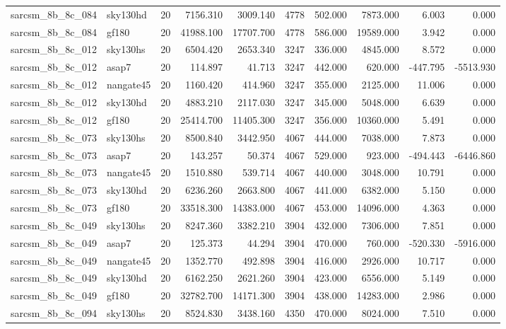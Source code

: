 \documentclass{article}
\begin{document}
\begin{longtable}{llrrrrrrrr}
sarcsm\_8b\_8c\_084 & sky130hd & 20 & 7156.310 & 3009.140 & 4778 & 502.000 & 7873.000 & 6.003 & 0.000 \\
sarcsm\_8b\_8c\_084 & gf180 & 20 & 41988.100 & 17707.700 & 4778 & 586.000 & 19589.000 & 3.942 & 0.000 \\
sarcsm\_8b\_8c\_012 & sky130hs & 20 & 6504.420 & 2653.340 & 3247 & 336.000 & 4845.000 & 8.572 & 0.000 \\
sarcsm\_8b\_8c\_012 & asap7 & 20 & 114.897 & 41.713 & 3247 & 442.000 & 620.000 & -447.795 & -5513.930 \\
sarcsm\_8b\_8c\_012 & nangate45 & 20 & 1160.420 & 414.960 & 3247 & 355.000 & 2125.000 & 11.006 & 0.000 \\
sarcsm\_8b\_8c\_012 & sky130hd & 20 & 4883.210 & 2117.030 & 3247 & 345.000 & 5048.000 & 6.639 & 0.000 \\
sarcsm\_8b\_8c\_012 & gf180 & 20 & 25414.700 & 11405.300 & 3247 & 356.000 & 10360.000 & 5.491 & 0.000 \\
sarcsm\_8b\_8c\_073 & sky130hs & 20 & 8500.840 & 3442.950 & 4067 & 444.000 & 7038.000 & 7.873 & 0.000 \\
sarcsm\_8b\_8c\_073 & asap7 & 20 & 143.257 & 50.374 & 4067 & 529.000 & 923.000 & -494.443 & -6446.860 \\
sarcsm\_8b\_8c\_073 & nangate45 & 20 & 1510.880 & 539.714 & 4067 & 440.000 & 3048.000 & 10.791 & 0.000 \\
sarcsm\_8b\_8c\_073 & sky130hd & 20 & 6236.260 & 2663.800 & 4067 & 441.000 & 6382.000 & 5.150 & 0.000 \\
sarcsm\_8b\_8c\_073 & gf180 & 20 & 33518.300 & 14383.000 & 4067 & 453.000 & 14096.000 & 4.363 & 0.000 \\
sarcsm\_8b\_8c\_049 & sky130hs & 20 & 8247.360 & 3382.210 & 3904 & 432.000 & 7306.000 & 7.851 & 0.000 \\
sarcsm\_8b\_8c\_049 & asap7 & 20 & 125.373 & 44.294 & 3904 & 470.000 & 760.000 & -520.330 & -5916.000 \\
sarcsm\_8b\_8c\_049 & nangate45 & 20 & 1352.770 & 492.898 & 3904 & 416.000 & 2926.000 & 10.717 & 0.000 \\
sarcsm\_8b\_8c\_049 & sky130hd & 20 & 6162.250 & 2621.260 & 3904 & 423.000 & 6556.000 & 5.149 & 0.000 \\
sarcsm\_8b\_8c\_049 & gf180 & 20 & 32782.700 & 14171.300 & 3904 & 438.000 & 14283.000 & 2.986 & 0.000 \\
sarcsm\_8b\_8c\_094 & sky130hs & 20 & 8524.830 & 3438.160 & 4350 & 470.000 & 8024.000 & 7.510 & 0.000 \\

\end{longtable}
\end{document}
